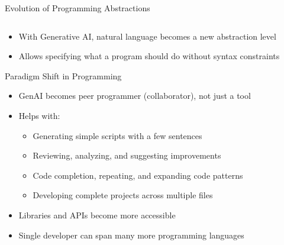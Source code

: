 \documentclass[xcolor=dvipsnames, aspectratio=169]{beamer}
\begin{document}
\begin{frame}{Evolution of Programming Abstractions}
\begin{columns}
\begin{column}{0.4\textwidth}
    \end{column}
  \end{columns}
  
  \begin{alertbox}
    \begin{itemize}
      \item With Generative AI, natural language becomes a new abstraction level
      \item Allows specifying what a program should do without syntax constraints
    \end{itemize}
  \end{alertbox}
\end{frame}


\begin{frame}{Paradigm Shift in Programming}
  \begin{itemize}
    \item GenAI becomes peer programmer (collaborator), not just a tool
    \item Helps with:
      \begin{itemize}
        \item Generating simple scripts with a few sentences
        \item Reviewing, analyzing, and suggesting improvements
        \item Code completion, repeating, and expanding code patterns
        \item Developing complete projects across multiple files
      \end{itemize}
    \item Libraries and APIs become more accessible
    \item Single developer can span many more programming languages
  \end{itemize}
\end{frame}
\end{document}
